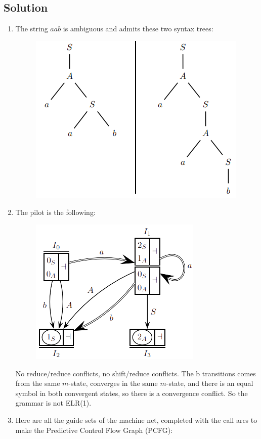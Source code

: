 \documentclass[12pt, a4paper]{report}
\begin{document}
    \subsection*{Solution}
        \begin{enumerate}
            \item The string $a a b$ is ambiguous and admits these two syntax trees:
                \begin{figure}[H]
                    \centering
                    \includegraphics[width=0.5\linewidth]{images/syntax.png}
                \end{figure} 
            \item The pilot is the following: 
                \begin{figure}[H]
                    \centering
                    \includegraphics[width=0.5\linewidth]{images/synsol.png}
                \end{figure} 
                No reduce/reduce conflicts, no shift/reduce conflicts. The b transitions comes from the same $m$-state, converges in the same $m$-state, and there is 
                an equal symbol in both convergent states, so there is a convergence conflict. So the grammar is not ELR(1). 
            \item Here are all the guide sets of the machine net, completed with the call arcs to make the Predictive Control Flow Graph (PCFG):
                \begin{figure}[H]

\end{figure}
\end{enumerate}
\end{document}
